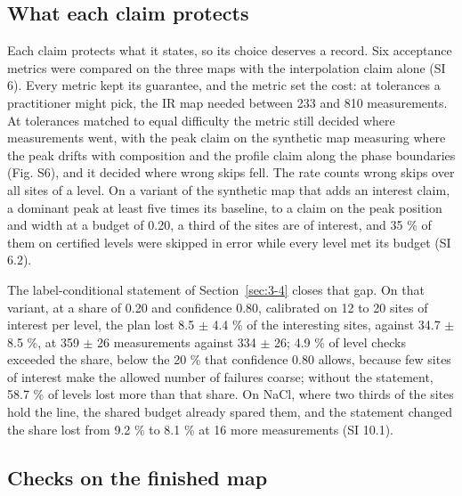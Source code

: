\documentclass{iopjournal}
\begin{document}
\hypertarget{sec:5-5}{%
\subsection{What each claim protects}\label{sec:5-5}}

Each claim protects what it states, so its choice deserves a record. Six acceptance metrics were compared on the three maps with the interpolation claim alone (SI 6). Every metric kept its guarantee, and the metric set the cost: at tolerances a practitioner might pick, the IR map needed between 233 and 810 measurements. At tolerances matched to equal difficulty the metric still decided where measurements went, with the peak claim on the synthetic map measuring where the peak drifts with composition and the profile claim along the phase boundaries (Fig. S6), and it decided where wrong skips fell. The rate counts wrong skips over all sites of a level. On a variant of the synthetic map that adds an interest claim, a dominant peak at least five times its baseline, to a claim on the peak position and width at a budget of 0.20, a third of the sites are of interest, and 35 \% of them on certified levels were skipped in error while every level met its budget (SI 6.2).

The label-conditional statement of Section~\ref{sec:3-4} closes that gap. On that variant, at a share of 0.20 and confidence 0.80, calibrated on 12 to 20 sites of interest per level, the plan lost 8.5 \ensuremath{\pm} 4.4 \% of the interesting sites, against 34.7 \ensuremath{\pm} 8.5 \%, at 359 \ensuremath{\pm} 26 measurements against 334 \ensuremath{\pm} 26; 4.9 \% of level checks exceeded the share, below the 20 \% that confidence 0.80 allows, because few sites of interest make the allowed number of failures coarse; without the statement, 58.7 \% of levels lost more than that share. On NaCl, where two thirds of the sites hold the line, the shared budget already spared them, and the statement changed the share lost from 9.2 \% to 8.1 \% at 16 more measurements (SI 10.1).

\hypertarget{sec:5-6}{%
\subsection{Checks on the finished map}\label{sec:5-6}}
\end{document}
